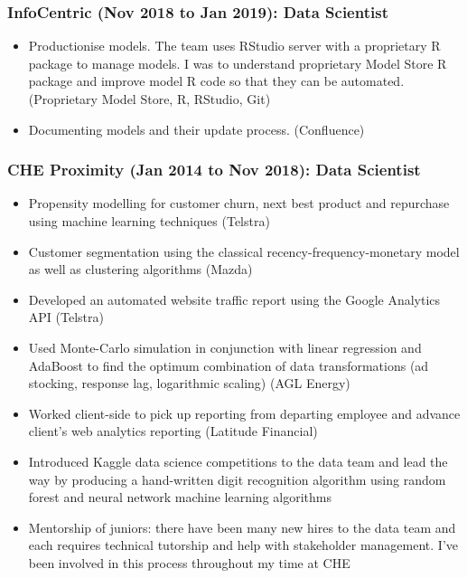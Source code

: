 \documentclass{article}
\begin{document}
\subsubsection{InfoCentric (Nov 2018 to Jan 2019): Data Scientist}
\begin{itemize}
    \item Productionise models. The team uses RStudio server with a proprietary R package to manage models. I was to understand proprietary Model Store R package and improve model R code so that they can be automated. (Proprietary Model Store, R, RStudio, Git)
    \item Documenting models and their update process. (Confluence)
\end{itemize}

\subsubsection{CHE Proximity (Jan 2014 to Nov 2018): Data Scientist}

\begin{itemize}
    \item Propensity modelling for customer churn, next best product and repurchase using machine learning techniques (Telstra)
    \item Customer segmentation using the classical recency-frequency-monetary model as well as clustering algorithms (Mazda)
    \item Developed an automated website traffic report using the Google Analytics API (Telstra)
    \item Used Monte-Carlo simulation in conjunction with linear regression and AdaBoost to find the optimum combination of data transformations (ad stocking, response lag, logarithmic scaling) (AGL Energy)
    \item Worked client-side to pick up reporting from departing employee and advance client's web analytics reporting (Latitude Financial)
    \item Introduced Kaggle data science competitions to the data team and lead the way by producing a hand-written digit recognition algorithm using random forest and neural network machine learning algorithms
    \item Mentorship of juniors: there have been many new hires to the data team and each requires technical tutorship and help with stakeholder management. I've been involved in this process throughout my time at CHE
\end{itemize}
\end{document}
